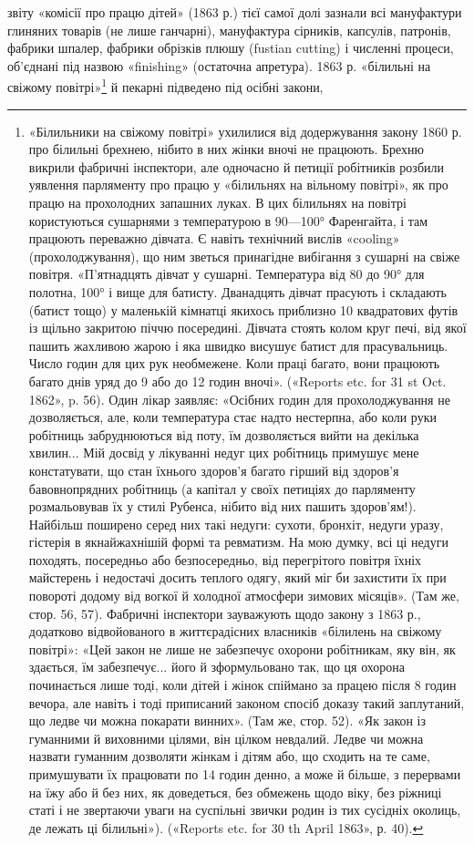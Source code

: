 звіту «комісії про працю дітей» (1863 р.) тієї самої долі зазнали
всі мануфактури глиняних товарів (не лише ганчарні), мануфактура
сірників, капсулів, патронів, фабрики шпалер, фабрики
обрізків плюшу (fustian cutting) і численні процеси, об’єднані
під назвою «finishing» (остаточна апретура). 1863 р. «білильні
на свіжому повітрі»\footnote{
«Білильники на свіжому повітрі» ухилилися від додержування
закону 1860 р. про білильні брехнею, нібито в них жінки вночі не працюють.
Брехню викрили фабричні інспектори, але одночасно й петиції
робітників розбили уявлення парляменту про працю у «білильнях на
вільному повітрі», як про працю на прохолодних запашних луках. В цих
білильнях на повітрі користуються сушарнями з температурою в 90—100°
Фаренгайта, і там працюють переважно дівчата. Є навіть технічний вислів
«cooling» (прохолоджування), що ним зветься принагідне вибігання з
сушарні на свіже повітря. «П’ятнадцять дівчат у сушарні. Температура
від 80 до 90° для полотна, 100° і вище для батисту. Дванадцять дівчат прасують
і складають (батист тощо) у маленькій кімнатці якихось приблизно
10 квадратових футів із щільно закритою піччю посередині. Дівчата стоять
колом круг печі, від якої пашить жахливою жарою і яка швидко висушує
батист для прасувальниць. Число годин для цих рук необмежене. Коли
праці багато, вони працюють багато днів уряд до 9 або до 12 годин вночі».
(«Reports etc. for 31 st Oct. 1862», p. 56). Один лікар заявляє: «Осібних
годин для прохолоджування не дозволяється, але, коли температура стає
надто нестерпна, або коли руки робітниць забруднюються від поту, їм
дозволяється вийти на декілька хвилин... Мій досвід у лікуванні недуг
цих робітниць примушує мене констатувати, що стан їхнього здоров'я
багато гірший від здоров’я бавовнопрядних робітниць (а капітал у своїх
петиціях до парляменту розмальовував їх у стилі Рубенса, нібито від них
пашить здоров’ям!). Найбільш поширено серед них такі недуги: сухоти,
бронхіт, недуги уразу, гістерія в якнайжахнішій формі та ревматизм.
На мою думку, всі ці недуги походять, посередньо або безпосередньо,
від перегрітого повітря їхніх майстерень і недостачі досить теплого одягу,
який міг би захистити їх при повороті додому від вогкої й холодної атмосфери
зимових місяців». (Там же, стор. 56, 57). Фабричні інспектори зауважують
щодо закону з 1863 р., додатково відвойованого в життєрадісних
власників «білилень на свіжому повітрі»: «Цей закон не лише не забезпечує
охорони робітникам, яку він, як здається, їм забезпечує... його й
зформульовано так, що ця охорона починається лише тоді, коли дітей
і жінок спіймано за працею після 8 годин вечора, але навіть і тоді приписаний
законом спосіб доказу такий заплутаний, що ледве чи можна
покарати винних». (Там же, стор. 52). «Як закон із гуманними й виховними
цілями, він цілком невдалий. Ледве чи можна назвати гуманним
дозволяти жінкам і дітям або, що сходить на те саме, примушувати їх
працювати по 14 годин денно, а може й більше, з перервами на їжу або
й без них, як доведеться, без обмежень щодо віку, без ріжниці статі
і не звертаючи уваги на суспільні звички родин із тих сусідніх околиць,
де лежать ці білильні»). («Reports etc. for 30 th April 1863», р. 40).
} й пекарні підведено під осібні закони,
